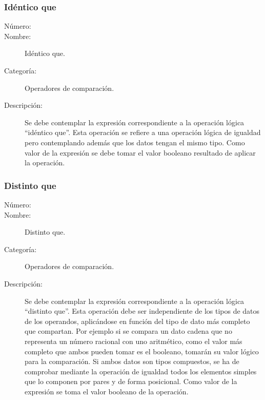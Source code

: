\subsubsection{Idéntico que}
	\begin{description}
		\item [Número:] \cn
		\item [Nombre:] Idéntico que.
		\item [Categoría:] Operadores de comparación.
		\item [Descripción:] Se debe contemplar la expresión correspondiente a la operación lógica ``idéntico que''. Esta operación
		se refiere a una operación lógica de igualdad pero contemplando además que los datos tengan el mismo tipo. Como valor
		de la expresión se debe tomar el valor booleano resultado de aplicar la operación.
	\end {description}

\subsubsection{Distinto que}
	\begin{description}
		\item [Número:] \cn
		\item [Nombre:] Distinto que.
		\item [Categoría:] Operadores de comparación.
		\item [Descripción:] Se debe contemplar la expresión correspondiente a la operación lógica ``distinto que''. Esta operación
		debe ser independiente de los tipos de datos de los operandos, aplicándose en función del tipo de dato más completo que compartan.
		Por ejemplo si se compara un dato cadena que no representa un número racional con uno aritmético, como el valor más completo que
		ambos pueden tomar es el booleano, tomarán su valor lógico para la comparación.  
		Si ambos datos son tipos compuestos, se ha de comprobar mediante la operación de igualdad todos los elementos simples que lo componen
		por pares y de forma posicional.
		Como valor de la expresión se toma el valor booleano de la operación.
	\end {description}

